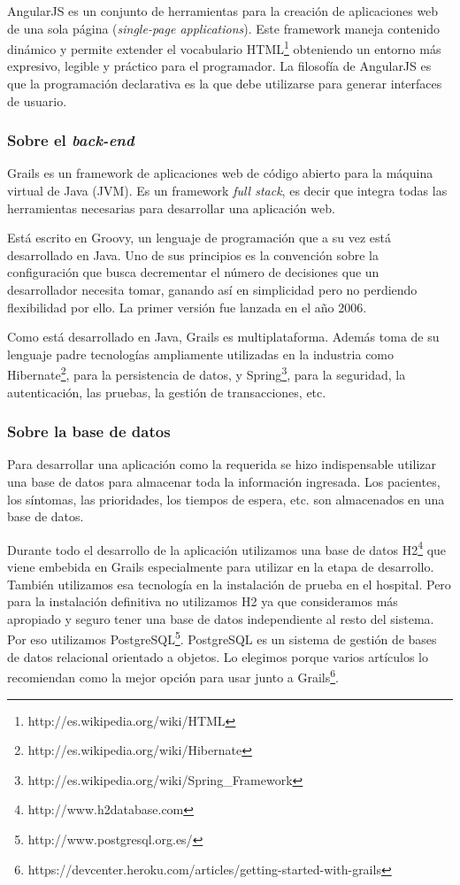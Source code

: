 AngularJS es un conjunto de herramientas para la creación de aplicaciones web de una sola página (\textit{single-page applications}). Este framework maneja contenido dinámico y permite extender el vocabulario HTML\footnote{http://es.wikipedia.org/wiki/HTML} obteniendo un entorno más expresivo, legible y práctico para el programador. La filosofía de AngularJS es que la programación declarativa es la que debe utilizarse para generar interfaces de usuario.

\subsubsection{Sobre el \textit{back-end}}
Grails es un framework de aplicaciones web de código abierto para la máquina virtual de Java (JVM). Es un framework \textit{full stack}, es decir que integra todas las herramientas necesarias para desarrollar una aplicación web.

Está escrito en Groovy, un lenguaje de programación que a su vez está desarrollado en Java. Uno de sus principios es la convención sobre la configuración que busca decrementar el número de decisiones que un desarrollador necesita tomar, ganando así en simplicidad pero no perdiendo flexibilidad por ello. La primer versión fue lanzada en el año 2006.

Como está desarrollado en Java, Grails es multiplataforma. Además toma de su lenguaje padre tecnologías ampliamente utilizadas en la industria como Hibernate\footnote{http://es.wikipedia.org/wiki/Hibernate}, para la persistencia de datos, y Spring\footnote{http://es.wikipedia.org/wiki/Spring\_Framework}, para la seguridad, la autenticación, las pruebas, la gestión de transacciones, etc.

\subsubsection{Sobre la base de datos}
Para desarrollar una aplicación como la requerida se hizo indispensable utilizar una base de datos para almacenar toda la información ingresada. Los pacientes, los síntomas, las prioridades, los tiempos de espera, etc. son almacenados en una base de datos.

Durante todo el desarrollo de la aplicación utilizamos una base de datos H2\footnote{http://www.h2database.com} que viene embebida en Grails especialmente para utilizar en la etapa de desarrollo. También utilizamos esa tecnología en la instalación de prueba en el hospital. Pero para la instalación definitiva no utilizamos H2 ya que consideramos más apropiado y seguro tener una base de datos independiente al resto del sistema. Por eso utilizamos PostgreSQL\footnote{http://www.postgresql.org.es/}. PostgreSQL es un sistema de gestión de bases de datos relacional orientado a objetos. Lo elegimos porque varios artículos lo recomiendan como la mejor opción para usar junto a Grails\footnote{https://devcenter.heroku.com/articles/getting-started-with-grails}.


